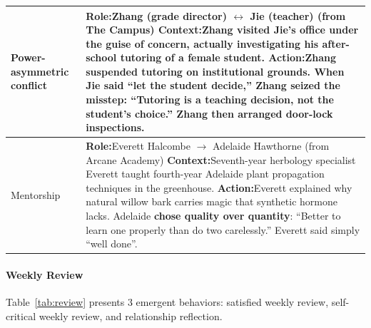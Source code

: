 \begin{table}[t]
\begin{tabular}{p{0.8in}p{4.3in}}
Power-\newline asymmetric \newline conflict
&
\textbf{Role:}\quad Zhang (grade director) $\leftrightarrow$ Jie (teacher) \hfill (from The Campus) \newline
\textbf{Context:}\quad Zhang visited Jie's office under the guise of concern, actually investigating his after-school tutoring of a female student. \newline
\textbf{Action:}\quad Zhang suspended tutoring on institutional grounds. When Jie said ``let the student decide,'' \textbf{Zhang seized the misstep}: ``Tutoring is a teaching decision, not the student's choice.'' Zhang then arranged door-lock inspections. 
\\
\midrule

Mentorship
&
\textbf{Role:}\quad Everett Halcombe $\to$ Adelaide Hawthorne \hfill (from Arcane Academy) \newline
\textbf{Context:}\quad Seventh-year herbology specialist Everett taught fourth-year Adelaide plant propagation techniques in the greenhouse. \newline
\textbf{Action:}\quad Everett explained why natural willow bark carries magic that synthetic hormone lacks. Adelaide \textbf{chose quality over quantity}: ``Better to learn one properly than do two carelessly.'' Everett said simply ``well done''. 
\\
\bottomrule
\end{tabular}
\end{table}

\paragraph{Weekly Review}
Table~\ref{tab:review} presents 3 emergent behaviors:
satisfied weekly review, self-critical weekly review, and relationship reflection.

